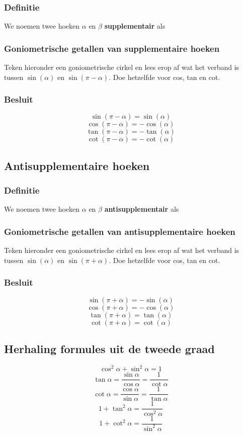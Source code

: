 \documentclass[a4paper,12pt]{article}
\begin{document}
\subsubsection{Definitie}
We noemen twee hoeken $\alpha$ en $\beta$ \textbf{supplementair} als \arulefill
\subsubsection{Goniometrische getallen van supplementaire hoeken}
Teken hieronder een goniometrische cirkel en lees erop af wat het verband is tussen $\sin(\alpha)$ en $\sin(\pi-\alpha)$. Doe hetzelfde voor cos, tan en cot.
\vspace*{7cm}
\subsubsection{Besluit}
\[\sin(\pi-\alpha)=\sin(\alpha)
\]
\[\cos(\pi-\alpha)=-\cos(\alpha)
\]
\[\tan(\pi-\alpha)=-\tan(\alpha)
\]
\[\cot(\pi-\alpha)=-\cot(\alpha)
\]

\subsection{Antisupplementaire hoeken}
\subsubsection{Definitie}
We noemen twee hoeken $\alpha$ en $\beta$ \textbf{antisupplementair} als \arulefill
\subsubsection{Goniometrische getallen van antisupplementaire hoeken}
Teken hieronder een goniometrische cirkel en lees erop af wat het verband is tussen $\sin(\alpha)$ en $\sin(\pi+\alpha)$. Doe hetzelfde voor cos, tan en cot.
\vspace*{6cm}
\subsubsection{Besluit}
\[\sin(\pi+\alpha)=-\sin(\alpha)
\]
\[\cos(\pi+\alpha)=-\cos(\alpha)
\]
\[\tan(\pi+\alpha)=\tan(\alpha)
\]
\[\cot(\pi+\alpha)=\cot(\alpha)
\]
\subsection{Herhaling formules uit de tweede graad}
\[\cos^{2}\alpha+\sin^{2}\alpha=1\]
\[\tan\alpha=\frac{\sin\alpha}{\cos\alpha}=\frac{1}{\cot\alpha}\]
\[\cot\alpha=\frac{\cos\alpha}{\sin\alpha}=\frac{1}{\tan\alpha}\]
\[1+\tan^{2}\alpha=\frac{1}{\cos^{2}\alpha}\]
\[1+\cot^{2}\alpha=\frac{1}{\sin^{2}\alpha}\]
\end{document}

